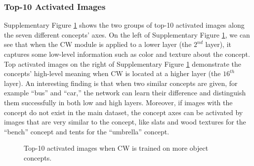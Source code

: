 \documentclass{article}
\begin{document}
\subsubsection{Top-10 Activated Images}
\label{sec:top10_all}
Supplementary Figure  \ref{fig:top10_all} shows the two groups of top-10 activated images along the seven different concepts' axes. 
On the left of Supplementary Figure  \ref{fig:top10_all}, we can see that when the CW module is applied to a lower layer (the $2^{nd}$ layer), it captures some low-level information such as color and texture about the concept. Top activated images on the right of Supplementary Figure  \ref{fig:top10_all} demonstrate the concepts' high-level meaning when CW is located at a higher layer (the $16^{th}$ layer). %
An interesting finding is that when two similar concepts are given, for example ``bus'' and ``car,'' the network can learn their difference and distinguish them successfully in both low and high layers. Moreover, if images with the concept do not exist in the main dataset, the concept axes can be activated by images that are very similar to the concept, like slats and wood textures for the ``bench'' concept and tents for the ``umbrella'' concept. 

\begin{figure}[htbp]
  \caption{Top-10 activated images when CW is trained on more object concepts.}
  \label{fig:top10_all}
\end{figure}
\end{document}
